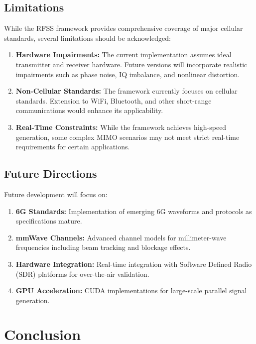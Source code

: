 \documentclass[twocolumn,10pt]{article}
\begin{document}
\subsection{Limitations}

While the RFSS framework provides comprehensive coverage of major cellular standards, several limitations should be acknowledged:

\begin{enumerate}
\item \textbf{Hardware Impairments:} The current implementation assumes ideal transmitter and receiver hardware. Future versions will incorporate realistic impairments such as phase noise, IQ imbalance, and nonlinear distortion.

\item \textbf{Non-Cellular Standards:} The framework currently focuses on cellular standards. Extension to WiFi, Bluetooth, and other short-range communications would enhance its applicability.

\item \textbf{Real-Time Constraints:} While the framework achieves high-speed generation, some complex MIMO scenarios may not meet strict real-time requirements for certain applications.
\end{enumerate}

\subsection{Future Directions}

Future development will focus on:

\begin{enumerate}
\item \textbf{6G Standards:} Implementation of emerging 6G waveforms and protocols as specifications mature.

\item \textbf{mmWave Channels:} Advanced channel models for millimeter-wave frequencies including beam tracking and blockage effects.

\item \textbf{Hardware Integration:} Real-time integration with Software Defined Radio (SDR) platforms for over-the-air validation.

\item \textbf{GPU Acceleration:} CUDA implementations for large-scale parallel signal generation.
\end{enumerate}

\section{Conclusion}
\end{document}
